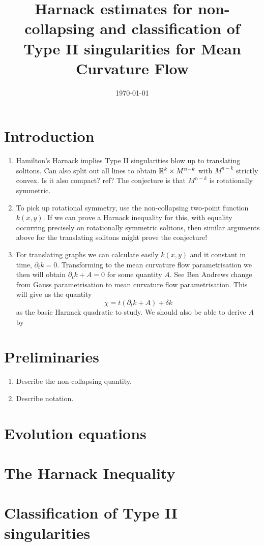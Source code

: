 \documentclass{amsart}
\begin{document}
\title[Harnack and Type II Classification]
 {Harnack estimates for non-collapsing and classification of Type II singularities for Mean Curvature Flow}

\curraddr{}
\email{}
\date{\today}

\dedicatory{}
\subjclass[2010]{}
\keywords{}

\begin{abstract}
\end{abstract}

\maketitle

\section{Introduction}

\begin{enumerate}
\item Hamilton's Harnack implies Type II singularities blow up to translating solitons. Can also split out all lines to obtain $\mathbb{R}^k \times M^{n-k}$ with $M^{n-k}$ strictly convex. Is it also compact? ref? The conjecture is that $M^{n-k}$ is rotationally symmetric. 
\item To pick up rotational symmetry, use the non-collapsing two-point function $k(x,y)$. If we can prove a Harnack inequality for this, with equality occurring precisely on rotationally symmetric solitons, then similar arguments above for the translating solitons might prove the conjecture!
\item For translating graphs we can calculate easily $k(x,y)$ and it constant in time, $\partial_t k = 0$. Transforming to the mean curvature flow parametrisation we then will obtain $\partial_t k + A = 0$ for some quantity $A$. See Ben Andrews change from Gauss parametrisation to mean curvature flow parametrisation. This will give us the quantity 
\[
\chi = t(\partial_t k + A) + \delta k
\]
as the basic Harnack quadratic to study. We should also be able to derive $A$ by 
\end{enumerate}

\section{Preliminaries}

\begin{enumerate}
\item Describe the non-collapsing quantity.
\item Describe notation.
\end{enumerate}

\section{Evolution equations}

\section{The Harnack Inequality}

\section{Classification of Type II singularities}



\end{document}

